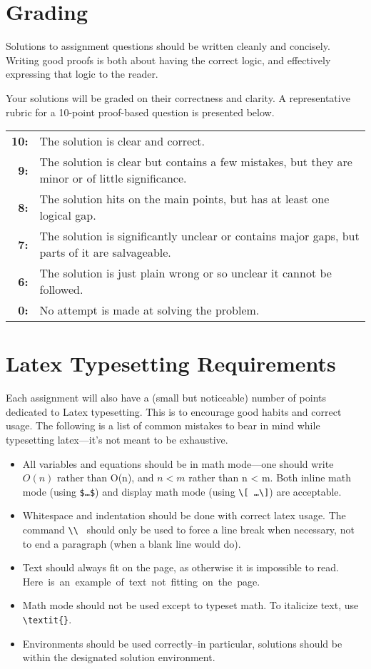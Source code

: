 \documentclass{article}
\theoremstyle{definition}
\begin{document}
\section{Grading}

Solutions to assignment questions should be written cleanly and concisely.  Writing good proofs is both about having the correct logic, and effectively expressing that logic to the reader.

Your solutions will be graded on their correctness and clarity.  A representative rubric for a 10-point proof-based question is presented below.

\smallskip
\begin{tabular}{rl}
  \textbf{10:}& 	The solution is clear and correct.\\
\textbf{9:} &	The solution is clear but contains a few mistakes, but they are minor or of little significance.\\
\textbf{8:} &	The solution hits on the main points, but has at least one logical gap.\\
\textbf{7:} &	The solution is significantly unclear or contains major gaps, but parts of it are salvageable.\\
\textbf{6:} &	The solution is just plain wrong or so unclear it cannot be followed.\\
\textbf{0:} &	No attempt is made at solving the problem.
\end{tabular}
\smallskip

\section{Latex Typesetting Requirements}

Each assignment will also have a (small but noticeable) number of points dedicated to Latex typesetting.  This is to encourage good habits and correct usage.  The following is a list of common mistakes to bear in mind while typesetting latex---it's not meant to be exhaustive.

\begin{itemize}[noitemsep]
  \item All variables and equations should be in math mode---one should write $O(n)$ rather than O(n), and $n < m$ rather than n < m.  Both inline math mode (using \texttt{\$\ldots \$}) and display math mode (using \texttt{\textbackslash[ \ldots \textbackslash]}) are acceptable.
  \item Whitespace and indentation should be done with correct latex usage.  The command \texttt{\textbackslash\textbackslash} ~should only be used to force a line break when necessary, not to end a paragraph (when a blank line would do).
  \item Text should always fit on the page, as otherwise it is impossible to read.  \mbox{Here is an example of text not fitting on the page.}
  \item Math mode should not be used except to typeset math.  To italicize text, use \verb|\textit{}|.
  \item Environments should be used correctly--in particular, solutions should be within the designated solution environment.
\end{itemize}
\end{document}
